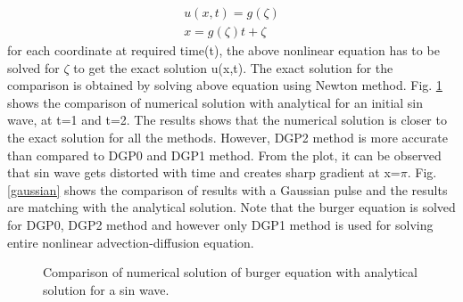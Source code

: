 \documentclass[12pt]{elsarticle}
\begin{document}
\begin{equation}
\begin{gathered}
u(x,t)=g(\zeta)\\
x=g(\zeta)t+\zeta
\end{gathered}
\end{equation}
for each coordinate at required time(t), the above nonlinear equation has to be solved for $\zeta$ to get the exact solution u(x,t). The exact solution for the comparison is obtained by solving above equation using Newton method. Fig. \ref{sinwave} shows the comparison of numerical solution with analytical for an initial sin wave, at t=1 and t=2. The results shows that the numerical solution is closer to the exact solution for all the methods. However, DGP2 method is more accurate than compared to DGP0 and DGP1 method. From the plot, it can be observed that sin wave gets distorted with time and creates sharp gradient at x=$\pi$. Fig. \ref{gaussian} shows the comparison of results with a Gaussian pulse and the results are matching with the analytical solution. Note that the burger equation is solved for DGP0, DGP2 method and however only DGP1 method is used for solving entire nonlinear advection-diffusion equation.


\begin{figure}[ht]
\centering
{}
%
%
\caption{Comparison of numerical solution of burger equation with analytical solution for a sin wave.}
\label{sinwave}
\end{figure}
\end{document}
